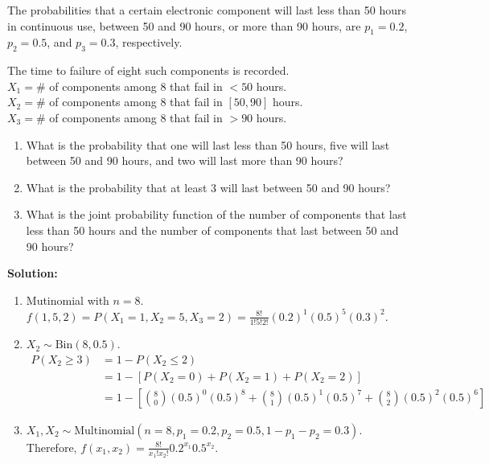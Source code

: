 \begin{example}
    The probabilities that a certain electronic component will last less than 50 hours in continuous use, between 50 and 90 hours, or more than 90 hours, are $p_1 = 0.2$, $p_2 = 0.5$, and $p_3 = 0.3$, respectively.

    The time to failure of eight such components is recorded. \\
    $X_1 = \#$ of components among 8 that fail in $< 50$ hours. \\
    $X_2 = \#$ of components among 8 that fail in $[50,90]$ hours. \\
    $X_3 = \#$ of components among 8 that fail in $> 90$ hours.
    \begin{enumerate}[label=(\alph*)]
        \item What is the probability that one will last less than 50 hours, five will last between 50 and 90 hours, and two will last more than 90 hours?
        \item What is the probability that at least 3 will last between 50 and 90 hours?
        \item What is the joint probability function of the number of components that last less than 50 hours and the number of components that last between 50 and 90 hours?
    \end{enumerate}

    \textbf{Solution:}
    \begin{enumerate}[label=(\alph*)]
        \item Mutinomial with $n=8$. $f(1,5,2) = P(X_1 = 1, X_2 = 5, X_3 = 2) = \frac{8!}{1!5!2!}(0.2)^1 (0.5)^5 (0.3)^2$.
        \item $X_2 \sim \text{Bin}(8,0.5)$. \vspace{-3mm}
        \begin{align*}
            P(X_2 \geq 3) &= 1 - P(X_2 \leq 2) \\
            &= 1 - \left[ P(X_2 = 0) + P(X_2 = 1) + P(X_2 = 2) \right] \\
            &= 1 - \left[ \binom{8}{0} (0.5)^0 (0.5)^8 + \binom{8}{1} (0.5)^1 (0.5)^7 + \binom{8}{2} (0.5)^2 (0.5)^6 \right]
        \end{align*}
        \item $X_1,X_2 \sim \text{Multinomial}(n=8,p_1=0.2,p_2=0.5,1-p_1 -p_2 = 0.3)$. \\
        Therefore, $f(x_1,x_2) = \frac{8!}{x_1! x_2!}0.2^{x_1}0.5^{x_2}$.
    \end{enumerate}
\end{example}



